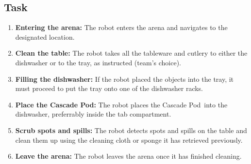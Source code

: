 \subsection{Task}
	\begin{enumerate}
		\item \textbf{Entering the arena:} The robot enters the arena and navigates to the designated location.
		\item \textbf{Clean the table:} The robot takes all the tableware and cutlery to either the dishwasher or to the tray, as instructed (team's choice).
		\item \textbf{Filling the dishwasher:} If the robot placed the objects into the tray, it must proceed to put the tray onto one of the dishwasher racks.
		\item \textbf{Place the Cascade Pod:} The robot places the  Cascade Pod~into the dishwasher, preferrably inside the tab compartment.
		\item \textbf{Scrub spots and spills:} The robot detects spots and spills on the table and clean them up using the cleaning cloth or sponge it has retrieved previously.
		\item \textbf{Leave the arena:} The robot leaves the arena once it has finished cleaning.
	\end{enumerate}


